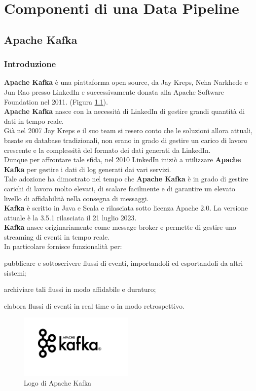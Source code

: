 \chapter{Componenti di una Data Pipeline}\label{cap:Componenti di una Data Pipeline}
\section{Apache Kafka}
\subsection{Introduzione}
\textbf{Apache Kafka} è una piattaforma \gls{open source}{}, da Jay Kreps, Neha Narkhede e Jun Rao presso LinkedIn e successivamente donata alla \gls{Apache Software Foundation}{} nel 2011. (Figura \ref{fig:logo_kafka}).\\
\textbf{Apache Kafka} nasce con la necessità di LinkedIn di gestire grandi quantità di dati in tempo reale.\\ Già nel 2007 
Jay Kreps e il suo team si resero conto che le soluzioni allora attuali, basate su database tradizionali, non erano in grado di gestire 
un carico di lavoro crescente e la complessità del formato dei dati generati da LinkedIn.\\
Dunque per affrontare tale sfida, nel 2010 LinkedIn iniziò a utilizzare \textbf{Apache Kafka} per gestire i dati di log generati dai vari servizi. \\
Tale adozione ha dimostrato nel tempo che \textbf{Apache Kafka} è in grado di gestire carichi di lavoro molto elevati, di scalare facilmente e di garantire un elevato livello di affidabilità nella consegna di messaggi.\\ 
\textbf{Kafka} è scritto in Java e Scala e rilasciata sotto licenza Apache 2.0. La versione attuale è la 3.5.1 rilasciata il 21 luglio 2023.\\
\textbf{Kafka} nasce originariamente come \gls{message broker} e permette di gestire uno \gls{streaming di eventi}{} in tempo reale. \\ 
In particolare fornisce funzionalità per:
\begin{list}{*}{}
    \item pubblicare e sottoscrivere flussi di eventi, importandoli ed esportandoli da altri sistemi;
    \item archiviare tali flussi in modo affidabile e duraturo;
    \item elabora flussi di eventi in real time o in modo retrospettivo.
\end{list}
\begin{figure}[h]
    \centering
    \includegraphics[width=0.5\textwidth]{images/componenti/logo_kafka.png}
    \caption{Logo di Apache Kafka}
    \label{fig:logo_kafka}
\end{figure}
\pagebreak
